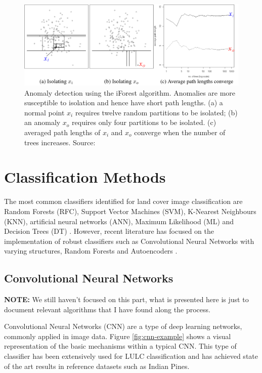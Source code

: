 \documentclass[12pt, english, openany]{book}
\begin{document}
\begin{figure}[H]
	\centering
	\includegraphics[width=1\linewidth]{iforest_demo.png}
  \caption[Anomaly detection using the iForest algorithm.]{Anomaly detection
  using the iForest algorithm. Anomalies are more susceptible to isolation and
  hence have short path lengths. (a) a normal point $x_i$ requires twelve
  random partitions to be isolated; (b) an anomaly $x_o$ requires only four
  partitions to be isolated. (c) averaged path lengths of $x_i$ and $x_o$
  converge when the number of trees increases. Source: \cite{Liu2008}}
  \label{fig:iforest-demonstration}
\end{figure}



\section{Classification Methods}

The most common classifiers identified for land cover image classification are
Random Forests (RFC), Support Vector Machines (SVM), K-Nearest Neighbours
(KNN), artificial neural networks (ANN), Maximum Likelihood (ML) and Decision
Trees (DT) \cite{Khatami2016, Maxwell2018}. However, recent literature has
focused on the implementation of robust classifiers such as Convolutional
Neural Networks with varying structures, Random Forests and Autoencoders
\cite{Roy2019, Zhang2017, Li2016}.

\subsection*{Convolutional Neural Networks}

\textbf{NOTE:} We still haven't focused on this part, what is presented here is
just to document relevant algorithms that I have found along the process.

Convolutional Neural Networks (CNN) are a type of deep learning networks,
commonly applied in image data. Figure \ref{fig:cnn-example} shows a visual
representation of the basic mechanisms within a typical CNN. This type of
classifier has been extensively used for LULC classification and has achieved
state of the art results in reference datasets such as Indian Pines.
\end{document}
